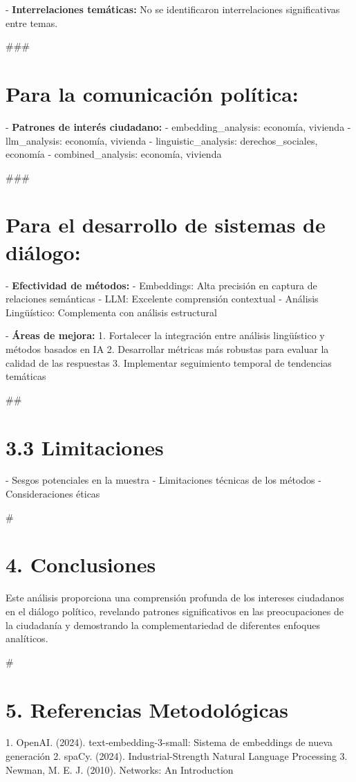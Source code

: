 \documentclass[12pt,a4paper]{article}
\begin{document}
- \textbf{Interrelaciones temáticas:}
  No se identificaron interrelaciones significativas entre temas.

            ###\section{Para la comunicación política:}
            - \textbf{Patrones de interés ciudadano:}  - embedding_analysis: economía, vivienda
  - llm_analysis: economía, vivienda
  - linguistic_analysis: derechos_sociales, economía
  - combined_analysis: economía, vivienda

            ###\section{Para el desarrollo de sistemas de diálogo:}
            - \textbf{Efectividad de métodos:}
            - Embeddings: Alta precisión en captura de relaciones semánticas
            - LLM: Excelente comprensión contextual
            - Análisis Lingüístico: Complementa con análisis estructural

            - \textbf{Áreas de mejora:}
            1. Fortalecer la integración entre análisis lingüístico y métodos basados en IA
            2. Desarrollar métricas más robustas para evaluar la calidad de las respuestas
            3. Implementar seguimiento temporal de tendencias temáticas
            

            ##\section{3.3 Limitaciones}
            - Sesgos potenciales en la muestra
            - Limitaciones técnicas de los métodos
            - Consideraciones éticas

            #\section{4. Conclusiones}
            Este análisis proporciona una comprensión profunda de los intereses ciudadanos en el diálogo político,
            revelando patrones significativos en las preocupaciones de la ciudadanía y demostrando la
            complementariedad de diferentes enfoques analíticos.

            #\section{5. Referencias Metodológicas}
            1. OpenAI. (2024). text-embedding-3-small: Sistema de embeddings de nueva generación
            2. spaCy. (2024). Industrial-Strength Natural Language Processing
            3. Newman, M. E. J. (2010). Networks: An Introduction
            
\end{document}
